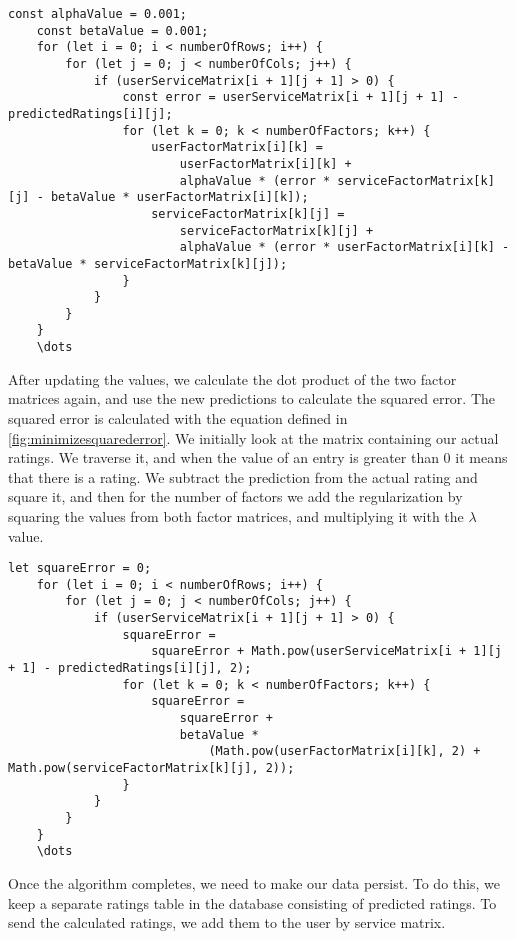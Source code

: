 \begin{lstlisting}[caption={}, captionpos=b, label={}]
    const alphaValue = 0.001;
    const betaValue = 0.001;
    for (let i = 0; i < numberOfRows; i++) {
        for (let j = 0; j < numberOfCols; j++) {
            if (userServiceMatrix[i + 1][j + 1] > 0) {
                const error = userServiceMatrix[i + 1][j + 1] - predictedRatings[i][j];
                for (let k = 0; k < numberOfFactors; k++) {
                    userFactorMatrix[i][k] =
                        userFactorMatrix[i][k] +
                        alphaValue * (error * serviceFactorMatrix[k][j] - betaValue * userFactorMatrix[i][k]);
                    serviceFactorMatrix[k][j] =
                        serviceFactorMatrix[k][j] +
                        alphaValue * (error * userFactorMatrix[i][k] - betaValue * serviceFactorMatrix[k][j]);
                }
            }
        }
    }
    \dots
\end{lstlisting}
After updating the values, we calculate the dot product of the two factor matrices again, and use the new predictions to calculate the squared error.
The squared error is calculated with the equation defined in \autoref{fig:minimizesquarederror}.
We initially look at the matrix containing our actual ratings.
We traverse it, and when the value of an entry is greater than 0 it means that there is a rating.
We subtract the prediction from the actual rating and square it, and then for the number of factors we add the regularization by squaring the values from both factor matrices, and multiplying it with the $\lambda$ value.
\begin{lstlisting}[caption={}, captionpos=b, label={}]
    let squareError = 0;
    for (let i = 0; i < numberOfRows; i++) {
        for (let j = 0; j < numberOfCols; j++) {
            if (userServiceMatrix[i + 1][j + 1] > 0) {
                squareError =
                    squareError + Math.pow(userServiceMatrix[i + 1][j + 1] - predictedRatings[i][j], 2);
                for (let k = 0; k < numberOfFactors; k++) {
                    squareError =
                        squareError +
                        betaValue *
                            (Math.pow(userFactorMatrix[i][k], 2) + Math.pow(serviceFactorMatrix[k][j], 2));
                }
            }
        }
    }
    \dots
\end{lstlisting}
Once the algorithm completes, we need to make our data persist.
To do this, we keep a separate ratings table in the database consisting of predicted ratings.
To send the calculated ratings, we add them to the user by service matrix.
